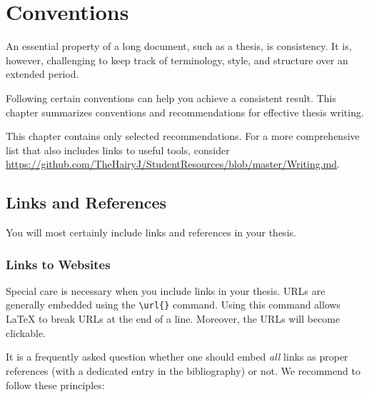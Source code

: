 \chapter{Conventions} %

\label{Chapter2} %


An essential property of a long document, such as a thesis, is consistency.%
It is, however, challenging to keep track of terminology, style, and structure over an extended period.

Following certain conventions can help you achieve a consistent result. This chapter summarizes conventions and recommendations for effective thesis writing.

This%
 chapter contains only selected recommendations. For a more comprehensive list that also includes links to useful tools, consider \url{https://github.com/TheHairyJ/StudentResources/blob/master/Writing.md}.

\section{Links and References}

You will most certainly include links and references in your thesis.

\subsection{Links to Websites}

Special care is necessary when you include links in your thesis. URLs are generally embedded using the \verb|\url{}| command. Using this command allows LaTeX to break URLs at the end of a line. Moreover, the URLs will become clickable.

It is a frequently asked question whether one should embed \emph{all} links as proper references (with a dedicated entry in the bibliography) or not. We recommend to follow these principles:%

